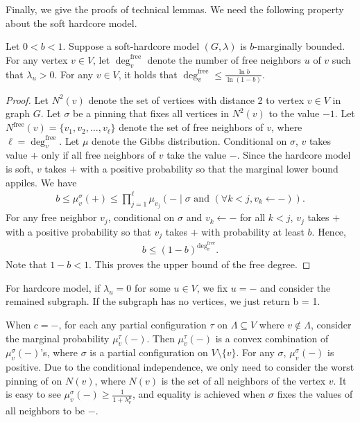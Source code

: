 Finally, we give the proofs of technical lemmas.
We need the following property about the soft hardcore model.
\begin{lemma}\label{lem:const-degree}
Let $0 < b < 1$. Suppose a soft-hardcore model $(G,\lambda)$ is $b$-marginally bounded. For any vertex $v \in V$, let $\deg_v^{\text{free}}$ denote the number of free neighbors $u$ of $v$ such that $\lambda_u > 0$. For any $v \in V$, it holds that $\deg_v^{\text{free}} \leq \frac{\ln b}{\ln (1- b)}$.
\end{lemma}
\begin{proof}
Let $N^2(v)$ denote the set of vertices with distance 2 to vertex $v \in V$ in graph $G$. 
Let $\sigma$ be a pinning that fixes all vertices in $N^2(v)$ to the value $-1$. 
Let $N^{\text{free}}(v)=\{v_1,v_2,\ldots,v_\ell\}$ denote the set of free neighbors of $v$, where $\ell = \deg^{\text{free}}_v$. 
Let $\mu$ denote  the Gibbs distribution.
Conditional on $\sigma$, $v$ takes value $+$ only if all free neighbors of $v$ take the value $-$. 
Since the hardcore model is soft, $v$ takes $+$ with a positive probability so that the marginal lower bound appiles.
We have
\begin{align*}
    b\leq \mu_v^\sigma(+) \leq \prod_{j = 1}^\ell \mu_{v_j}(-\mid \sigma \text{ and } (\forall k < j, v_k \gets -)). 
\end{align*}
For any free neighbor $v_j$, conditional on $\sigma$ and $ v_k \gets -$ for all $k < j$, $v_j$ takes $+$ with a positive probability so that $v_j$ takes $+$ with probability at least $b$. Hence,
\begin{align*}
    b \leq (1-b)^{\deg^{\text{free}}_v}. 
\end{align*}
Note that $1 - b < 1$. This proves the upper bound of the free degree.
\end{proof}


For hardcore model, if $\lambda_u=0$ for some $u\in V$, we fix $u=-$ and consider the remained subgraph. If the subgraph has no vertices, we just return b = 1. 

When $c=-$, for each any partial configuration $\tau$ on $\Lambda \subseteq V$ where $v \notin \Lambda$, consider the marginal probability $\mu_v^\tau(-)$.
Then $\mu_v^\tau(-)$ is a convex combination of $\mu_v^\sigma(-)$'s, where $\sigma$ is a partial configuration on $V  \setminus \{v\}$.
For any $\sigma$, $\mu^\sigma_v(-)$ is positive.
Due to the conditional independence, we only need to consider the worst pinning of on $N(v)$, where $N(v)$ is the set of all neighbors of the vertex $v$.
It is easy to see $\mu^\sigma_v(-) \geq \frac{1}{1+\lambda_v^\mu}$, and equality is achieved when $\sigma$ fixes the values of all neighbors to be $-$. 

